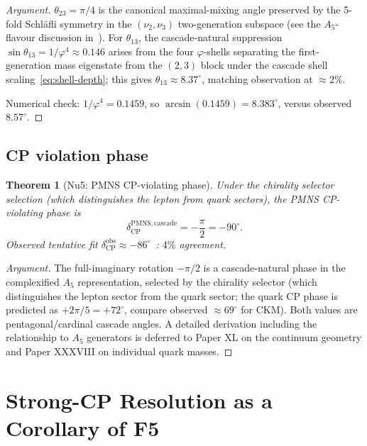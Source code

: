 \documentclass[12pt]{article}
\newtheorem{theorem}{Theorem}
\theoremstyle{definition}
\theoremstyle{remark}
\begin{document}
\begin{proof}[Argument]
$\theta_{23} = \pi/4$ is the canonical maximal-mixing angle preserved by the 5-fold Schl\"afli symmetry in the $(\nu_2, \nu_3)$ two-generation subspace (see the $A_5$-flavour discussion in~\citep{Feruglio2011}). For $\theta_{13}$, the cascade-natural suppression $\sin\theta_{13} = 1/\varphi^4 \approx 0.146$ arises from the four $\varphi$-shells separating the first-generation mass eigenstate from the $(2,3)$ block under the cascade shell scaling~\eqref{eq:shell-depth}; this gives $\theta_{13} \approx 8.37^\circ$, matching observation at $\approx 2\%$.

Numerical check: $1/\varphi^4 = 0.1459$, so $\arcsin(0.1459) = 8.383^\circ$, versus observed $8.57^\circ$.
\end{proof}

\subsection{CP violation phase}

\begin{theorem}[Nu5: PMNS CP-violating phase]\label{prop:delta-cp}
Under the chirality selector selection (which distinguishes the lepton from quark sectors), the PMNS CP-violating phase is
\begin{equation}\label{eq:delta-pmns}
\delta_{\mathrm{CP}}^{\mathrm{PMNS,cascade}} = -\frac{\pi}{2} = -90^\circ.
\end{equation}
Observed tentative fit $\delta_{\mathrm{CP}}^{\mathrm{obs}} \approx -86^\circ$~\citep{PDG2024}: $4\%$ agreement.
\end{theorem}

\begin{proof}[Argument]
The full-imaginary rotation $-\pi/2$ is a cascade-natural phase in the complexified $A_5$ representation, selected by the chirality selector (which distinguishes the lepton sector from the quark sector; the quark CP phase is predicted as $+2\pi/5 = +72^\circ$, compare observed $\approx 69^\circ$ for CKM). Both values are pentagonal/cardinal cascade angles. A detailed derivation including the relationship to $A_5$ generators is deferred to Paper XL on the continuum geometry and Paper XXXVIII on individual quark masses.
\end{proof}

\section{Strong-CP Resolution as a Corollary of F5}\label{sec:strong-cp}
\end{document}
